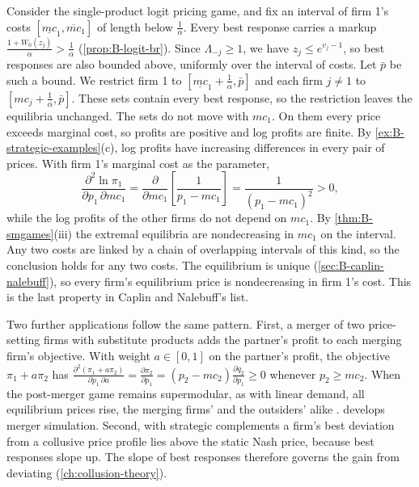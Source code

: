 \begin{example}\label{ex:B-logit-cost}
Consider the single-product logit pricing game, and fix an interval of firm 1's costs
$[\underline{mc}_1, \overline{mc}_1]$ of length below $\frac{1}{\alpha}$. Every best response carries a markup
$\frac{1 + W_0(z_j)}{\alpha} > \frac{1}{\alpha}$ (\cref{prop:B-logit-br}). Since $\Lambda_{-j} \geq 1$, we have
$z_j \leq e^{v_j - 1}$, so best responses are also bounded above, uniformly over the interval of costs. Let $\bar p$
be such a bound. We restrict firm 1 to $[\underline{mc}_1 + \frac{1}{\alpha}, \bar p]$ and each firm $j \neq 1$ to
$[mc_j + \frac{1}{\alpha}, \bar p]$. These sets contain every best response, so the restriction leaves the equilibria
unchanged. The sets do not move with $mc_1$. On them every price exceeds marginal cost, so profits are positive and
log profits are finite. By \cref{ex:B-strategic-examples}(c), log profits have increasing differences in every pair of
prices. With firm 1's marginal cost as the parameter,
\[
  \frac{\partial^2\ln\pi_1}{\partial p_1\,\partial mc_1} = \frac{\partial}{\partial mc_1}\left[\frac{1}{p_1 - mc_1}\right] = \frac{1}{(p_1 - mc_1)^2} > 0,
\]
while the log profits of the other firms do not depend on $mc_1$. By \cref{thm:B-smgames}(iii) the extremal
equilibria are nondecreasing in $mc_1$ on the interval. Any two costs are linked by a chain of overlapping intervals
of this kind, so the conclusion holds for any two costs. The equilibrium is unique (\cref{sec:B-caplin-nalebuff}), so every firm's
equilibrium price is nondecreasing in firm 1's cost. This is the last property in Caplin and Nalebuff's list.
\end{example}

Two further applications follow the same pattern. First, a merger of two price-setting firms with substitute
products adds the partner's profit to each merging firm's objective. With weight $a \in [0, 1]$ on the partner's
profit, the objective $\pi_1 + a\pi_2$ has $\frac{\partial^2(\pi_1 + a\pi_2)}{\partial p_1\,\partial a} = \frac{\partial\pi_2}{\partial p_1} = (p_2 - mc_2)\frac{\partial q_2}{\partial p_1} \geq 0$
whenever $p_2 \geq mc_2$. When the post-merger game remains supermodular, as with linear demand, all equilibrium
prices rise, the merging firms' and the outsiders' alike \citep{DeneckereDavidson1985}.  develops
merger simulation. Second, with strategic complements a firm's best deviation from a collusive price profile
lies above the static Nash price, because best responses slope up. The slope of best responses therefore
governs the gain from deviating (\cref{ch:collusion-theory}).

